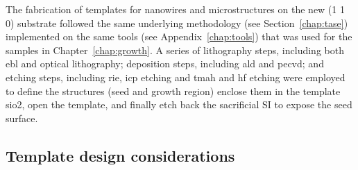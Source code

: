 The fabrication of templates for nanowires and microstructures on the new \hkl(1 1 0) substrate followed the same underlying methodology (see Section~\ref{chap:tase}) implemented on the same tools (see Appendix~\ref{chap:tools}) that was used for the samples in Chapter~\ref{chap:growth}. A series of lithography steps, including both \acf{ebl} and optical lithography; deposition steps, including \acf{ald} and \acf{pecvd}; and etching steps, including \acf{rie}, \acf{icp} etching and \acf{tmah} and \acf{hf} etching were employed to define the structures (seed and growth region) enclose them in the template \acs{sio2}, open the template, and finally etch back the sacrificial \acl{SI} to expose the seed surface.

\subsection{Template design considerations}


